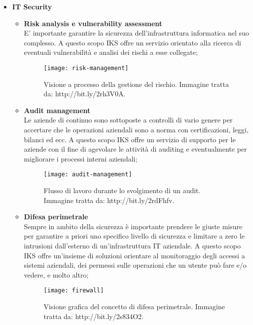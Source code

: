 \begin{itemize}
	\item \textbf{IT Security}\\
	 \begin{itemize}
	 	\item \textbf{Risk analysis e vulnerability assessment}\\ 
	 	E' importante garantire la sicurezza dell'infrastruttura informatica nel suo complesso. 
	 	A questo scopo IKS offre un servizio orientato alla ricerca di eventuali vulnerabilità e 
	 	analisi dei rischi a esse collegate;
	 
	 	\begin{figure}[htbp]
	 		\begin{center}
	 			\texttt{[image: risk-management]}
	 			\caption{Visione a processo della gestione del rischio. Immagine tratta da: http://bit.ly/2rh3V0A.}
	 		\end{center}
	 	\end{figure}
	 		 	
		\item \textbf{Audit management}\\
		Le aziende di continuo sono sottoposte a controlli di vario genere per accertare che le 
		operazioni aziendali sono a norma con certificazioni, leggi, bilanci ed ecc. A questo 
		scopo IKS offre un servizio di supporto per le aziende con il fine di agevolare le 
		attività di auditing e eventualmente per migliorare i processi interni aziendali;
		\begin{figure}[htbp]
			\begin{center}
				\hspace{3em}
				\texttt{[image: audit-management]}
				\caption{Flusso di lavoro durante lo svolgimento di un audit. Immagine tratta da: http://bit.ly/2rdFhfv.}
			\end{center}
		\end{figure}
	
		\newpage
	 	\item \textbf{Difesa perimetrale}\\ 
	 	Sempre in ambito della sicurezza è importante prendere le giuste misure per garantire 
	 	a priori uno specifico livello di sicurezza e limitare a zero le intrusioni dall'esterno 
	 	di un'infrastruttura IT aziendale. A questo scopo IKS offre un'insieme di soluzioni 
	 	orientare al monitoraggio degli accessi a sistemi aziendali, dei permessi sulle operazioni 
	 	che un utente può fare e/o vedere, e molto altro;
	 	\begin{figure}[htbp]
	 		\begin{center}
	 			\texttt{[image: firewall]}
	 			\caption{Visione grafica del concetto di difesa perimetrale. Immagine tratta da: http://bit.ly/2s834O2.}
	 		\end{center}
	 	\end{figure}
	 	

\end{itemize}
\end{itemize}
